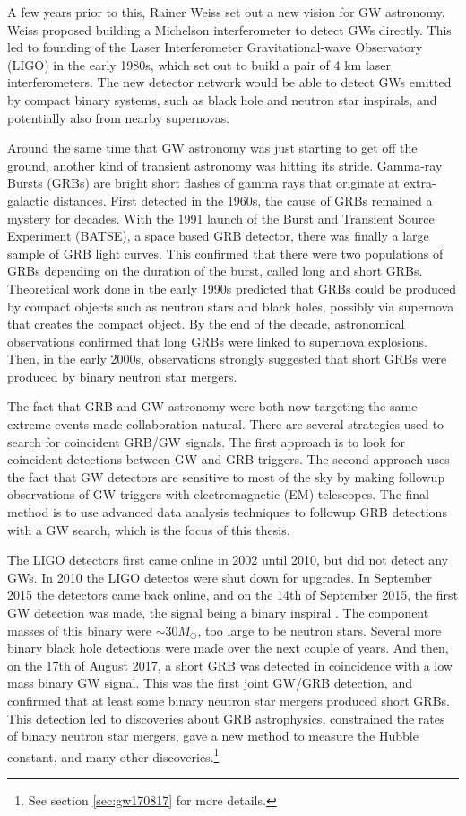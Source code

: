 \documentclass[11pt]{cuthesis}
\begin{document}
A few years prior to this, Rainer Weiss set out a new vision for GW astronomy. Weiss proposed building a Michelson interferometer to detect GWs directly. \cite{weiss72} This led to founding of the Laser Interferometer Gravitational-wave Observatory (LIGO) in the early 1980s, which set out to build a pair of 4 km laser interferometers. The new detector network would be able to detect GWs emitted by compact binary systems, such as black hole and neutron star inspirals, and potentially also from nearby supernovas. 

Around the same time that GW astronomy was just starting to get off the ground, another kind of transient astronomy was hitting its stride. Gamma-ray Bursts (GRBs) are bright short flashes of gamma rays that originate at extra-galactic distances. First detected in the 1960s, the cause of GRBs remained a mystery for decades. With the 1991 launch of the Burst and Transient Source Experiment (BATSE), a space based GRB detector, there was finally a large sample of GRB light curves. This confirmed that there were two populations of GRBs depending on the duration of the burst, called long and short GRBs. Theoretical work done in the early 1990s predicted that GRBs could be produced by compact objects such as neutron stars and black holes, possibly via supernova that creates the compact object. By the end of the decade, astronomical observations confirmed that long GRBs were linked to supernova explosions. Then, in the early 2000s, observations strongly suggested that short GRBs were produced by binary neutron star mergers. 

The fact that GRB and GW astronomy were both now targeting the same extreme events made collaboration natural. There are several strategies used to search for coincident GRB/GW signals. The first approach is to look for coincident detections between GW and GRB triggers. The second approach uses the fact that GW detectors are sensitive to most of the sky by making followup observations of GW triggers with electromagnetic (EM) telescopes. The final method is to use advanced data analysis techniques to followup GRB detections with a GW search, which is the focus of this thesis. 

The LIGO detectors first came online in 2002 until 2010, but did not detect any GWs. In 2010 the LIGO detectos were shut down for upgrades. In September 2015 the detectors came back online, and on the 14th of September 2015, the first GW detection was made, the signal being a binary inspiral \cite{150914-det-paper}. The component masses of this binary were $\sim 30M_\odot$, too large to be neutron stars. Several more binary black hole detections were made over the next couple of years. \cite{catalog} And then, on the 17th of August 2017, a short GRB was detected in coincidence with a low mass binary GW signal. \cite{GW170817_det} This was the first joint GW/GRB detection, and confirmed that at least some binary neutron star mergers produced short GRBs. This detection led to discoveries about GRB astrophysics, constrained the rates of binary neutron star mergers, gave a new method to measure the Hubble constant, and many other discoveries.\footnote{See section \ref{sec:gw170817} for more details.}
\end{document}
